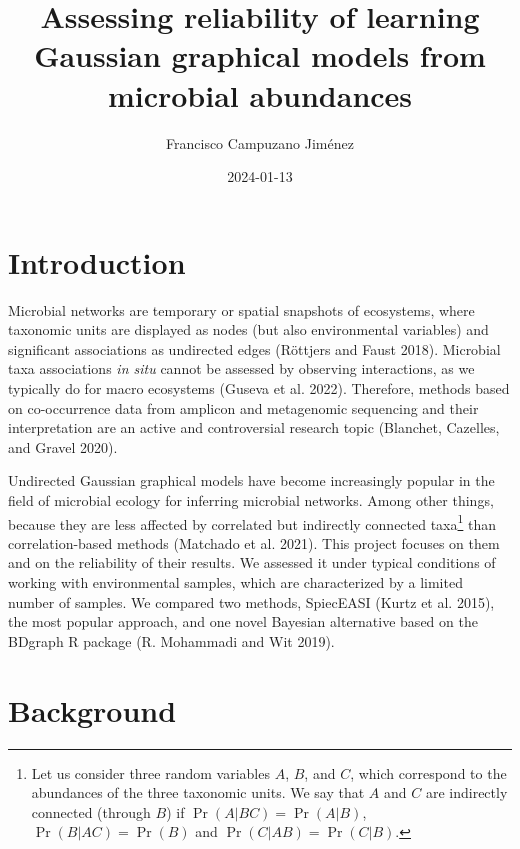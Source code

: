 \documentclass[
  a4paper,
]{article}
\title{Assessing reliability of learning Gaussian graphical models from
microbial abundances}
\author{Francisco Campuzano Jiménez}
\affil{%
                  Bioinformatics Research Centre, Aarhus University
              }
\date{2024-01-13}
\begin{document}
\maketitle
\newpage
\tableofcontents
\newpage\ifdefined\Shaded\renewenvironment{Shaded}{\begin{tcolorbox}[enhanced, boxrule=0pt, interior hidden, frame hidden, borderline west={3pt}{0pt}{shadecolor}, sharp corners, breakable]}{\end{tcolorbox}}\fi

\newpage

\hypertarget{introduction}{%
\section{Introduction}\label{introduction}}

Microbial networks are temporary or spatial snapshots of ecosystems,
where taxonomic units are displayed as nodes (but also environmental
variables) and significant associations as undirected edges (Röttjers
and Faust 2018). Microbial taxa associations \emph{in situ} cannot be
assessed by observing interactions, as we typically do for macro
ecosystems (Guseva et al. 2022). Therefore, methods based on
co-occurrence data from amplicon and metagenomic sequencing and their
interpretation are an active and controversial research topic (Blanchet,
Cazelles, and Gravel 2020).

Undirected Gaussian graphical models have become increasingly popular in
the field of microbial ecology for inferring microbial networks. Among
other things, because they are less affected by correlated but
indirectly connected taxa\footnote{Let us consider three random
  variables \(A\), \(B\), and \(C\), which correspond to the abundances
  of the three taxonomic units. We say that \(A\) and \(C\) are
  indirectly connected (through \(B\)) if \(\Pr(A |BC) = \Pr(A |B)\),
  \(\Pr(B |AC) = \Pr(B)\) and \(\Pr(C |AB) = \Pr(C |B)\).} than
correlation-based methods (Matchado et al. 2021). This project focuses
on them and on the reliability of their results. We assessed it under
typical conditions of working with environmental samples, which are
characterized by a limited number of samples. We compared two methods,
SpiecEASI (Kurtz et al. 2015), the most popular approach, and one novel
Bayesian alternative based on the BDgraph R package (R. Mohammadi and
Wit 2019).

\hypertarget{background}{%
\section{Background}\label{background}}
\end{document}
